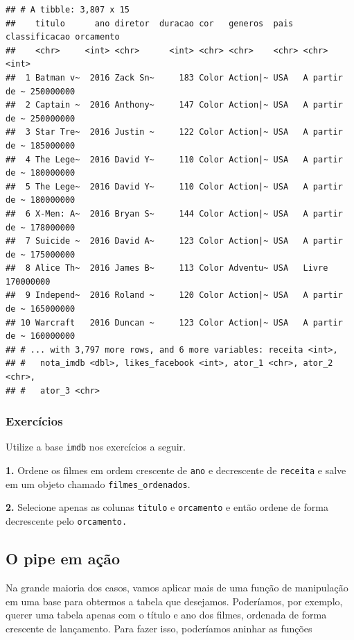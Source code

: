 \documentclass[
]{book}
\begin{document}
\begin{verbatim}
## # A tibble: 3,807 x 15
##    titulo      ano diretor  duracao cor   generos  pais  classificacao orcamento
##    <chr>     <int> <chr>      <int> <chr> <chr>    <chr> <chr>             <int>
##  1 Batman v~  2016 Zack Sn~     183 Color Action|~ USA   A partir de ~ 250000000
##  2 Captain ~  2016 Anthony~     147 Color Action|~ USA   A partir de ~ 250000000
##  3 Star Tre~  2016 Justin ~     122 Color Action|~ USA   A partir de ~ 185000000
##  4 The Lege~  2016 David Y~     110 Color Action|~ USA   A partir de ~ 180000000
##  5 The Lege~  2016 David Y~     110 Color Action|~ USA   A partir de ~ 180000000
##  6 X-Men: A~  2016 Bryan S~     144 Color Action|~ USA   A partir de ~ 178000000
##  7 Suicide ~  2016 David A~     123 Color Action|~ USA   A partir de ~ 175000000
##  8 Alice Th~  2016 James B~     113 Color Adventu~ USA   Livre         170000000
##  9 Independ~  2016 Roland ~     120 Color Action|~ USA   A partir de ~ 165000000
## 10 Warcraft   2016 Duncan ~     123 Color Action|~ USA   A partir de ~ 160000000
## # ... with 3,797 more rows, and 6 more variables: receita <int>,
## #   nota_imdb <dbl>, likes_facebook <int>, ator_1 <chr>, ator_2 <chr>,
## #   ator_3 <chr>
\end{verbatim}

\hypertarget{exercuxedcios-12}{%
\subsubsection*{Exercícios}\label{exercuxedcios-12}}

Utilize a base \texttt{imdb} nos exercícios a seguir.

\textbf{1.} Ordene os filmes em ordem crescente de \texttt{ano} e decrescente de \texttt{receita} e salve em um objeto chamado \texttt{filmes\_ordenados}.

\textbf{2.} Selecione apenas as colunas \texttt{titulo} e \texttt{orcamento} e então ordene de forma decrescente pelo \texttt{orcamento.}

\hypertarget{o-pipe-em-auxe7uxe3o}{%
\subsection{O pipe em ação}\label{o-pipe-em-auxe7uxe3o}}

Na grande maioria dos casos, vamos aplicar mais de uma função de manipulação em uma base para obtermos a tabela que desejamos. Poderíamos, por exemplo, querer uma tabela apenas com o título e ano dos filmes, ordenada de forma crescente de lançamento. Para fazer isso, poderíamos aninhar as funções
\end{document}
